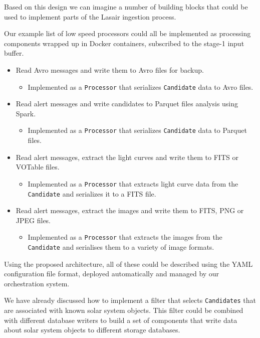 \documentclass{article}
\newcommand{\yaml} {YAML\xspace}
\newcommand{\avro} {Avro\xspace}
\newcommand{\fits} {FITS\xspace}
\newcommand{\png} {PNG\xspace}
\newcommand{\jpeg} {JPEG\xspace}
\newcommand{\parquet} {Parquet\xspace}
\newcommand{\votable} {VOTable\xspace}
\newcommand{\docker} {Docker\xspace}
\newcommand{\spark} {Spark\xspace}
\newcommand{\stageone} {stage-1\xspace}
\newcommand{\lasair} {Lasair\xspace}
\begin{document}
Based on this design we can imagine a number of building blocks that could be used to implement parts of the \lasair ingestion process.

Our example list of low speed processors could all be implemented as processing components wrapped up in \docker containers, subscribed to the \stageone input buffer.

\begin{itemize}
  \item Read \avro messages and write them to \avro files for backup.
  \begin{itemize}
    \item Implemented as a \texttt{Processor} that serializes \texttt{Candidate} data to \avro files.
  \end{itemize}

  \item Read alert messages and write candidates to \parquet files analysis using \spark.
  \begin{itemize}
    \item Implemented as a \texttt{Processor} that serializes \texttt{Candidate} data to \parquet files.
  \end{itemize}

  \item Read alert messages, extract the light curves and write them to \fits or \votable files.
  \begin{itemize}
    \item Implemented as a \texttt{Processor} that extracts light curve data from the \texttt{Candidate} and serializes it to a \fits file.
  \end{itemize}

  \item Read alert messages, extract the images and write them to \fits, \png or \jpeg files.
  
  \begin{itemize}
    \item Implemented as a \texttt{Processor} that extracts the images from the \texttt{Candidate} and serialises them to a variety of image formats.
  \end{itemize}
\end{itemize}

Using the proposed architecture, all of these could be described using the \yaml configuration file format, deployed automatically and managed by our orchestration system.

We have already discussed how to implement a filter that selects \texttt{Candidates} that are associated with known solar system objects. This filter could be combined with different database writers to build a set of components that write data about solar system objects to different storage databases.
\end{document}
